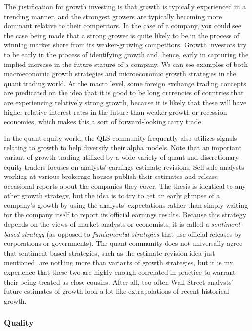 \documentclass[11pt]{report}
\begin{document}
					The justification for growth investing is that growth is typically experienced in a trending manner, and the strongest growers are typically becoming more dominant relative to their competitors. In the case of a company, you could see the case being made that a strong grower is quite likely to be in the process of winning market share from its weaker-growing competitors. Growth investors try to be early in the process of identifying growth and, hence, early in capturing the implied increase in the future stature of a company. We can see examples of both macroeconomic growth strategies and microeconomic growth strategies in the quant trading world. At the macro level, some foreign exchange trading concepts are predicated on the idea that it is good to be long currencies of countries that are experiencing relatively strong growth, because it is likely that these will have higher relative interest rates in the future than weaker-growth or recession economies, which makes this a sort of forward-looking carry trade.

					In the quant equity world, the QLS community frequently also utilizes signals relating to growth to help diversify their alpha models. Note that an important variant of growth trading utilized by a wide variety of quant and discretionary equity traders focuses on analysts' earnings estimate revisions. Sell-side analysts working at various brokerage houses publish their estimates and release occasional reports about the companies they cover. The thesis is identical to any other growth strategy, but the idea is to try to get an early glimpse of a company's growth by using the analysts' expectations rather than simply waiting for the company itself to report its official earnings results. Because this strategy depends on the views of market analysts or economists, it is called a \textit{sentiment-based strategy} (as opposed to \textit{fundamental strategies} that use official releases by corporations or governments). The quant community does not universally agree that sentiment-based strategies, such as the estimate revision idea just mentioned, are nothing more than variants of growth strategies, but it is my experience that these two are highly enough correlated in practice to warrant their being treated as close cousins. After all, too often Wall Street analysts' future estimates of growth look a lot like extrapolations of recent historical growth.

				\subsubsection{Quality}
\end{document}

